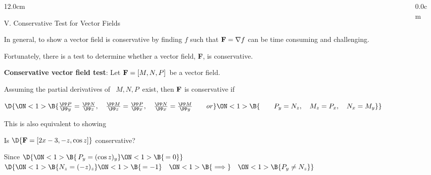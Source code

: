 \begin{frame}
\begin{columns}\begin{column}{12.0cm}

{V. Conservative Test for Vector Fields}

\vspace{0.3cm}

\scriptsize

In general, to show a vector field is conservative by finding $f$ such that ${\bf F} = \nabla f$ can be time consuming and challenging.

\vspace{0.5cm}

Fortunately, there is a test to determine whether a vector field, {\bf F}, is conservative.

\vspace{0.5cm}

{\bf Conservative vector field test}: \quad  Let ${\bf F} = [M,N,P]$\, be a vector field.  

\vspace{0.5cm}

Assuming the partial derivatives of \, $M, N, P$\,  exist, then ${\bf F}$ is conservative if 

\begin{center}
	$\D{
	\ON<1>{\B{
	\frac{\PP P}{\PP y} = \frac{\PP N}{\PP z}, \quad 
	\frac{\PP M}{\PP z} = \frac{\PP P}{\PP x}, \quad 
	\frac{\PP N}{\PP x} = \frac{\PP M}{\PP y} \qquad 
	or }}
	\ON<1>{\B{\qquad P_y = N_z, \quad M_z=P_x, \quad N_x=M_y}}}$
\end{center}

This is also equivalent to showing

\begin{center}
	 \quad 
	\ON<1>{\B{or \quad $\nabla \times {\bf F} = {\bf 0}$}}
\end{center}

\EX Is $\D{{\bf F} = [2x-3,-z,\cos z]}$ conservative?

\vspace{0.2cm}
Since $\D{
\ON<1>{\B{\, P_y = (\cos z)_y}}
\ON<1>{\B{\,= 0}}
}$ \quad 
{} \quad 
$\D{
\ON<1>{\B{N_z = (-z)_z}}
\ON<1>{\B{\, = -1}} \quad 
\ON<1>{\B{\implies}} \quad 
\ON<1>{\B{P_y \ne N_z}}}$

\vspace{0.2cm}


\vspace{1.2cm}

\end{column}\begin{column}{0.0cm}\end{column}\end{columns}
\end{frame}
